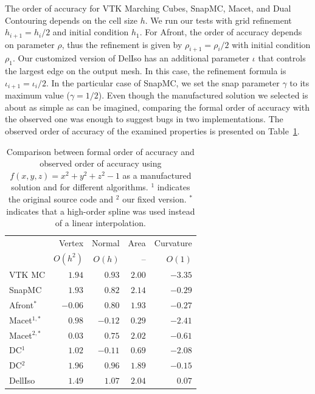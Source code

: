 The order of accuracy for VTK Marching Cubes, SnapMC, Macet, and Dual
Contouring depends on the cell size $h$. We run our tests with grid
refinement $h_{i+1} = h_{i} / 2$ and initial condition $h_1$. For
Afront, the order of accuracy depends on parameter $\rho$, thus the
refinement is given by $\rho_{i+1} = \rho_{i} / 2$ with initial
condition $\rho_1$. Our customized version of DelIso has an additional parameter $\iota$
that controls the largest edge on the output mesh. In this case, the refinement 
formula is
$\iota_{i+1} = \iota_{i} / 2$.
In the particular case of SnapMC, we set the snap
parameter  $\gamma$ to its maximum value ($\gamma = 1/2$). Even though
the manufactured solution we selected is about as simple as can be
imagined, comparing the formal order of accuracy with the observed one
was enough to suggest bugs in two implementations. The observed
order of accuracy of the examined properties 
is presented on Table~\ref{tab:results}.

\begin{table}[t]
\caption{Comparison between formal order of accuracy and observed
  order of accuracy using $f(x,y,z) = x^2 + y^2 + z^2 -1$ as a manufactured solution 
  and for different algorithms. $^1$ indicates the original source 
    code and $^2$ our fixed version.
   $^*$ indicates that a high-order spline was used instead of a 
linear interpolation.}
\centering
\begin{tabular}{lrrrr}
\hline
 & Vertex  & Normal & Area & Curvature \\
 & $O(h^2)$ & $O(h)$ & --  & $O(1)$ \\
\hline
VTK MC          &  $1.94$    & $0.93$  & $2.00$      & $-3.35$ \\
SnapMC          &  $1.93$    & $0.82$   & $2.14$     & $-0.29$ \\
Afront$^*$          &  $-0.06$ & $0.80$   & $1.93$     & $-0.27$ \\
 Macet$^{1,*}$      &  $0.98$    & $-0.12$  & $0.29$     & $-2.41$ \\
 Macet$^{2,*}$      &  $0.03$  & $0.75$   & $2.02$     & $-0.61$ \\
 DC$^1$         &  $1.02$    & $-0.11$  & $0.69$     & $-2.08$ \\
 DC$^2$         &  $1.96$    & $0.96$   & $1.89$     & $-0.15$ \\
 DellIso      &  $1.49$    & $1.07$  & $2.04$      & $0.07$ \\
\hline
\end{tabular}
\label{tab:results}
\end{table}


